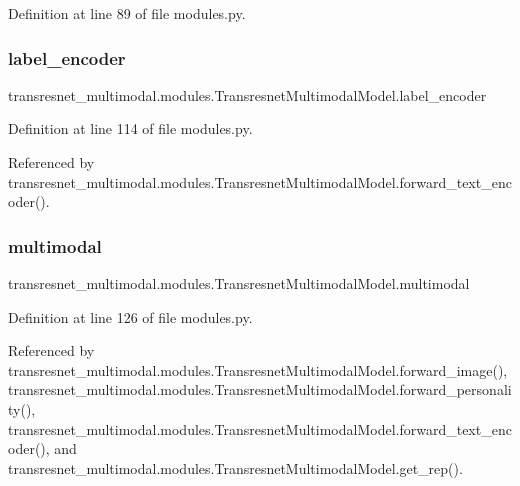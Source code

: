 Definition at line 89 of file modules.\+py.

\mbox{\label{classtransresnet__multimodal_1_1modules_1_1TransresnetMultimodalModel_a4362c115b423401d6a4a7f0becd101ff}} 
\subsubsection{\texorpdfstring{label\+\_\+encoder}{label\_encoder}}
{\footnotesize\ttfamily transresnet\+\_\+multimodal.\+modules.\+Transresnet\+Multimodal\+Model.\+label\+\_\+encoder}



Definition at line 114 of file modules.\+py.



Referenced by transresnet\+\_\+multimodal.\+modules.\+Transresnet\+Multimodal\+Model.\+forward\+\_\+text\+\_\+encoder().

\mbox{\label{classtransresnet__multimodal_1_1modules_1_1TransresnetMultimodalModel_a91db0743a901b988b167dc903da9da5a}} 
\subsubsection{\texorpdfstring{multimodal}{multimodal}}
{\footnotesize\ttfamily transresnet\+\_\+multimodal.\+modules.\+Transresnet\+Multimodal\+Model.\+multimodal}



Definition at line 126 of file modules.\+py.



Referenced by transresnet\+\_\+multimodal.\+modules.\+Transresnet\+Multimodal\+Model.\+forward\+\_\+image(), transresnet\+\_\+multimodal.\+modules.\+Transresnet\+Multimodal\+Model.\+forward\+\_\+personality(), transresnet\+\_\+multimodal.\+modules.\+Transresnet\+Multimodal\+Model.\+forward\+\_\+text\+\_\+encoder(), and transresnet\+\_\+multimodal.\+modules.\+Transresnet\+Multimodal\+Model.\+get\+\_\+rep().

